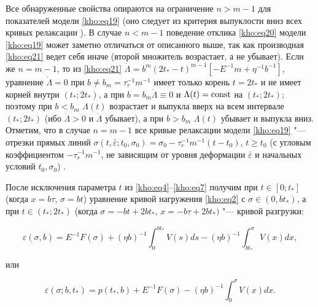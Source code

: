 \smallskip



Все обнаруженные свойства опираются на ограничение $n>m-1$ для показателей модели \eqref{kho:eq19} (оно следует из критерия выпуклости вниз всех кривых релаксации \cite{kho:bib4}). В случае $n<m-1$ поведение отклика \eqref{kho:eq20} модели \eqref{kho:eq19} может заметно отличаться от описанного выше, так как производная \eqref{kho:eq21} ведет себя иначе (второй множитель возрастает, а не убывает). Если же $n=m-1$, то из \eqref{kho:eq21} $\dot{\Lambda}=b^m(2t_\ast-t)^{m-1}[-E^{-1}m+\eta^{-1}b^{-1}]$, уравнение $\dot{\Lambda}=0$ при $b\ne b_m=\tau_r^{-1}m^{-1}$ имеет только корень $t=2t_\ast$ и не имеет корней внутри $(t_\ast;2t_\ast)$, а при $b=b_m\dot{\Lambda}\equiv0$ и $\Lambda(t)={\rm const}$ на $(t_\ast;2t_\ast)$; поэтому при $b<b_m$ $\Lambda(t)$ возрастает и выпукла вверх на всем интервале $(t_\ast;2t_\ast)$ (ибо $\dot{\Lambda}>0$ и $\dot{\Lambda}$ убывает), а при $b>b_m$ $\Lambda(t)$ убывает и выпукла вниз. Отметим, что в случае $n=m-1$ все кривые релаксации модели \eqref{kho:eq19} "--- отрезки прямых линий $\sigma(t,\bar{\varepsilon};t_0,\sigma _0)=\sigma_0-\tau_r^{-1}m^{-1}(t-t_0)$, $t\ge t_0$ (с угловым коэффициентом $-\tau_r^{-1}m^{-1}$, не зависящим от уровня деформации $\bar{\varepsilon}$ и начальных условий $t_0,\sigma _0$) \cite{kho:bib4}.



\smallskip




После исключения параметра $t$ из \eqref{kho:eq4}--\eqref{kho:eq7} получим при $t\in[0;t_\ast]$ (когда $x=b\tau$, $\sigma=bt$) уравнение кривой нагружения \eqref{kho:eq2} с $\sigma\in(0,bt_\ast)$, а при $t\in(t_\ast;2t_\ast)$ (когда $\sigma=-bt+2bt_\ast$, $x=-b\tau+2bt_\ast)$ "--- кривой разгрузки: 

\[

\varepsilon(\sigma,b)=E^{-1}F(\sigma)+(\eta b)^{-1}\int_0^{bt_\ast}{V(s)ds}-(\eta b)^{-1}\int_{bt_\ast}^\sigma{V(x)dx},

\]

или

\begin{equation}

\label{kho:eq32}

\varepsilon(\sigma;b,t_\ast)=p(t_\ast,b)+E^{-1}F(\sigma)-(\eta b)^{-1}\int_0^\sigma{V(x)dx}. 

\end{equation}


